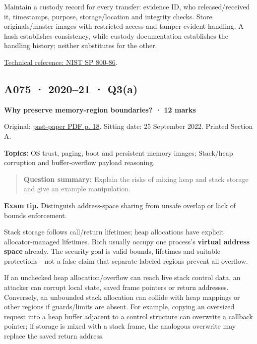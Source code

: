 \documentclass[11pt,a4paper]{article}
\begin{document}
Maintain a custody record for every transfer: evidence ID,\allowbreak{} who released/\allowbreak{}received it,\allowbreak{} timestamps,\allowbreak{} purpose,\allowbreak{} storage/\allowbreak{}location and integrity checks. Store originals/\allowbreak{}master images with restricted access and tamper-evident handling. A hash establishes consistency,\allowbreak{} while custody documentation establishes the handling history; neither substitutes for the other.


\href{https://nvlpubs.nist.gov/nistpubs/legacy/sp/nistspecialpublication800-86.pdf}{Technical reference: NIST SP 800-86}.




\clearpage
\subsection{A075 · 2020–21 · Q3(a)}\label{a075}

\textbf{Why preserve memory-region boundaries? · 12 marks}


Original: \href{../../CSE405-Security_Merged.pdf\#page=18}{past-paper PDF p. 18}. Sitting date: 25 September 2022. Printed Section A.


\textbf{Topics:} OS trust,\allowbreak{} paging,\allowbreak{} boot and persistent memory images; Stack/\allowbreak{}heap corruption and buffer-overflow payload reasoning.



\begin{quote}\small

\textbf{Question summary:} Explain the risks of mixing heap and stack storage and give an example manipulation.



\end{quote}


{\color{ForestGreen}\textbf{Exam tip.} Distinguish address-space sharing from unsafe overlap or lack of bounds enforcement.}


Stack storage follows call/\allowbreak{}return lifetimes; heap allocations have explicit allocator-managed lifetimes. Both usually occupy one process's \textbf{virtual address space} already. The security goal is valid bounds,\allowbreak{} lifetimes and suitable protections—not a false claim that separate labeled regions prevent all overflow.


If an unchecked heap allocation/\allowbreak{}overflow can reach live stack control data,\allowbreak{} an attacker can corrupt local state,\allowbreak{} saved frame pointers or return addresses. Conversely,\allowbreak{} an unbounded stack allocation can collide with heap mappings or other regions if guards/\allowbreak{}limits are absent. For example,\allowbreak{} copying an oversized request into a heap buffer adjacent to a control structure can overwrite a callback pointer; if storage is mixed with a stack frame,\allowbreak{} the analogous overwrite may replace the saved return address.
\end{document}
